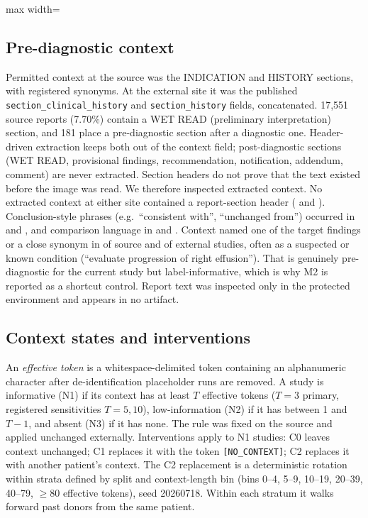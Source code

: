 \begin{table}[t]
\centering\small
\caption{Cohort construction. Source rows are sequential exclusions from the
committed Stage 3C waterfall; tiers are from the Stage 3E partition; external
counts are from the Stage 9b artifact.}
\label{tab:cohort}
\begin{adjustbox}{max width=\linewidth}

\end{adjustbox}
\end{table}

\subsection{Pre-diagnostic context}
Permitted context at the source was the INDICATION and HISTORY sections, with
registered synonyms. At the external site it was the published
\texttt{section\_clinical\_history} and \texttt{section\_history} fields,
concatenated. 17,551 source reports (7.70\%) contain a WET READ (preliminary
interpretation) section, and 181 place a pre-diagnostic section after a
diagnostic one. Header-driven extraction keeps both out of the context field;
post-diagnostic sections (WET READ, provisional findings, recommendation,
notification, addendum, comment) are never extracted. Section headers do not
prove that the text existed before the image was read. We therefore inspected
extracted context. No extracted context at either site contained a
report-section header (\ScanHeaderSrc{} and \ScanHeaderExt{}). Conclusion-style phrases
(e.g.\ ``consistent with'', ``unchanged from'') occurred in \ScanConclSrc{} and
\ScanConclExt{}, and comparison language in \ScanComparSrc{} and
\ScanComparExt{}. Context named one of the target findings or a close synonym
in \ScanTargetSrc{} of source and \ScanTargetExt{} of external studies, often as
a suspected or known condition (``evaluate progression of right effusion'').
That is genuinely pre-diagnostic for the current study but label-informative,
which is why M2 is reported as a shortcut control. Report text was inspected only in the protected environment and
appears in no artifact.

\subsection{Context states and interventions}
An \emph{effective token} is a whitespace-delimited token containing an
alphanumeric character after de-identification placeholder runs are removed. A
study is informative (N1) if its context has at least $T$ effective tokens
($T=3$ primary, registered sensitivities $T=5,10$), low-information (N2) if it
has between 1 and $T-1$, and absent (N3) if it has none. The rule was fixed on
the source and applied unchanged externally. Interventions apply to N1
studies: C0 leaves context unchanged; C1 replaces it with the token
\texttt{[NO\_CONTEXT]}; C2 replaces it with another patient's context. The C2
replacement is a deterministic rotation within strata defined by split and
context-length bin (bins 0--4, 5--9, 10--19, 20--39, 40--79, $\ge$80 effective
tokens), seed 20260718. Within each stratum it walks forward past donors from
the same patient.

